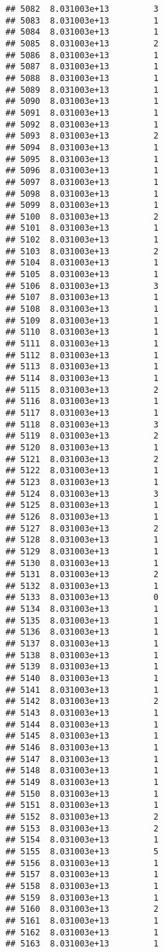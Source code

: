 \documentclass[
]{article}
\begin{document}
\begin{verbatim}
## 5082  8.031003e+13         3
## 5083  8.031003e+13         1
## 5084  8.031003e+13         1
## 5085  8.031003e+13         2
## 5086  8.031003e+13         1
## 5087  8.031003e+13         1
## 5088  8.031003e+13         1
## 5089  8.031003e+13         1
## 5090  8.031003e+13         1
## 5091  8.031003e+13         1
## 5092  8.031003e+13         1
## 5093  8.031003e+13         2
## 5094  8.031003e+13         1
## 5095  8.031003e+13         1
## 5096  8.031003e+13         1
## 5097  8.031003e+13         1
## 5098  8.031003e+13         1
## 5099  8.031003e+13         1
## 5100  8.031003e+13         2
## 5101  8.031003e+13         1
## 5102  8.031003e+13         1
## 5103  8.031003e+13         2
## 5104  8.031003e+13         1
## 5105  8.031003e+13         1
## 5106  8.031003e+13         3
## 5107  8.031003e+13         1
## 5108  8.031003e+13         1
## 5109  8.031003e+13         1
## 5110  8.031003e+13         1
## 5111  8.031003e+13         1
## 5112  8.031003e+13         1
## 5113  8.031003e+13         1
## 5114  8.031003e+13         1
## 5115  8.031003e+13         2
## 5116  8.031003e+13         1
## 5117  8.031003e+13         1
## 5118  8.031003e+13         3
## 5119  8.031003e+13         2
## 5120  8.031003e+13         1
## 5121  8.031003e+13         2
## 5122  8.031003e+13         1
## 5123  8.031003e+13         1
## 5124  8.031003e+13         3
## 5125  8.031003e+13         1
## 5126  8.031003e+13         1
## 5127  8.031003e+13         2
## 5128  8.031003e+13         1
## 5129  8.031003e+13         1
## 5130  8.031003e+13         1
## 5131  8.031003e+13         2
## 5132  8.031003e+13         1
## 5133  8.031003e+13         0
## 5134  8.031003e+13         1
## 5135  8.031003e+13         1
## 5136  8.031003e+13         1
## 5137  8.031003e+13         1
## 5138  8.031003e+13         1
## 5139  8.031003e+13         1
## 5140  8.031003e+13         1
## 5141  8.031003e+13         1
## 5142  8.031003e+13         2
## 5143  8.031003e+13         1
## 5144  8.031003e+13         1
## 5145  8.031003e+13         1
## 5146  8.031003e+13         1
## 5147  8.031003e+13         1
## 5148  8.031003e+13         1
## 5149  8.031003e+13         1
## 5150  8.031003e+13         1
## 5151  8.031003e+13         1
## 5152  8.031003e+13         2
## 5153  8.031003e+13         2
## 5154  8.031003e+13         1
## 5155  8.031003e+13         5
## 5156  8.031003e+13         1
## 5157  8.031003e+13         1
## 5158  8.031003e+13         1
## 5159  8.031003e+13         1
## 5160  8.031003e+13         2
## 5161  8.031003e+13         1
## 5162  8.031003e+13         1
## 5163  8.031003e+13         1

\end{verbatim}
\end{document}
